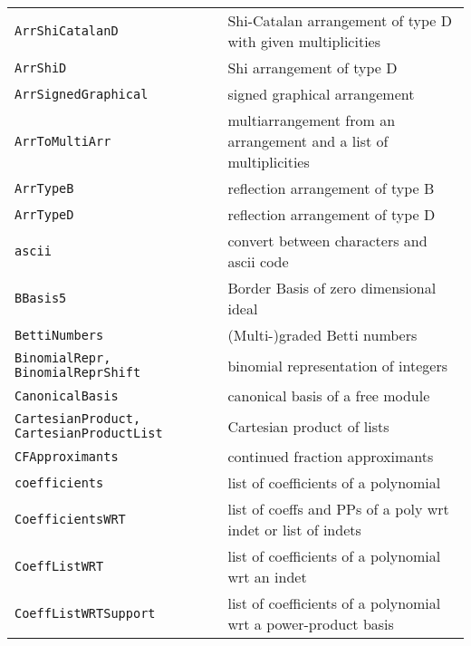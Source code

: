 \documentclass[a4paper]{mybook}
\begin{document}
\begin{center}
\begin{longtable}{ll}
{\verb~ArrShiCatalanD~} &
      Shi-Catalan arrangement of type D with given multiplicities\\
   
{\verb~ArrShiD~} &
      Shi arrangement of type D\\
   
{\verb~ArrSignedGraphical~} &
      signed graphical arrangement\\
   
{\verb~ArrToMultiArr~} &
      multiarrangement from an arrangement and a list of multiplicities\\
   
{\verb~ArrTypeB~} &
      reflection arrangement of type B\\
   
{\verb~ArrTypeD~} &
      reflection arrangement of type D\\
   
{\verb~ascii~} &
      convert between characters and ascii code\\
   
{\verb~BBasis5~} &
      Border Basis of zero dimensional ideal\\
   
{\verb~BettiNumbers~} &
      (Multi-)graded Betti numbers\\
   
{\verb~BinomialRepr, BinomialReprShift~} &
      binomial representation of integers\\
   
{\verb~CanonicalBasis~} &
      canonical basis of a free module\\
   
{\verb~CartesianProduct, CartesianProductList~} &
      Cartesian product of lists\\
   
{\verb~CFApproximants~} &
      continued fraction approximants\\
   
{\verb~coefficients~} &
      list of coefficients of a polynomial\\
   
{\verb~CoefficientsWRT~} &
      list of coeffs and PPs of a poly wrt indet or list of indets\\
   
{\verb~CoeffListWRT~} &
      list of coefficients of a polynomial wrt an indet\\
   
{\verb~CoeffListWRTSupport~} &
      list of coefficients of a polynomial wrt a power-product basis\\
   

\end{longtable}
\end{center}
\end{document}
